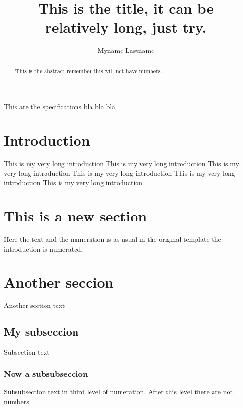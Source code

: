 \documentclass[11pt]{report}
\title{This is the title, it can be relatively long, just try.}
\author{Myname Lastname}
\begin{document}
\maketitle
\begin{specification}
	This are the specifications bla bla bla
\end{specification}

\begin{abstract}
	This is the abstract remember this will not have numbers.
\end{abstract}

\tableofcontents
\newpage

\section{Introduction}
This is my very long introduction This is my very long introduction This is my very long introduction This is my very long introduction This is my very long introduction This is my very long introduction 

\section{This is a new section}
Here the text and the numeration is as usual in the original template the introduction is numerated.

\section{Another seccion}
Another section text

\subsection{My subseccion}
Subsection text

\subsubsection{Now a subsubseccion}
Subsubsection text in third level of numeration. After this level there are not numbers
\end{document}
